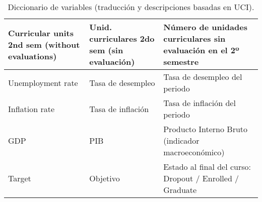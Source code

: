 \begin{table}[H]
\begin{tabular}{|p{5cm}|p{5cm}|p{6cm}|}
Curricular units 2nd sem (without evaluations) & Unid. curriculares 2do sem (sin evaluación) & Número de unidades curriculares sin evaluación en el 2º semestre \\ \hline
Unemployment rate & Tasa de desempleo & Tasa de desempleo del periodo \\ \hline
Inflation rate & Tasa de inflación & Tasa de inflación del periodo \\ \hline
GDP & PIB & Producto Interno Bruto (indicador macroeconómico) \\ \hline
Target & Objetivo & Estado al final del curso: Dropout / Enrolled / Graduate \\ \hline
\end{tabular}
\caption{Diccionario de variables (traducción y descripciones basadas en UCI).}
\end{table}
